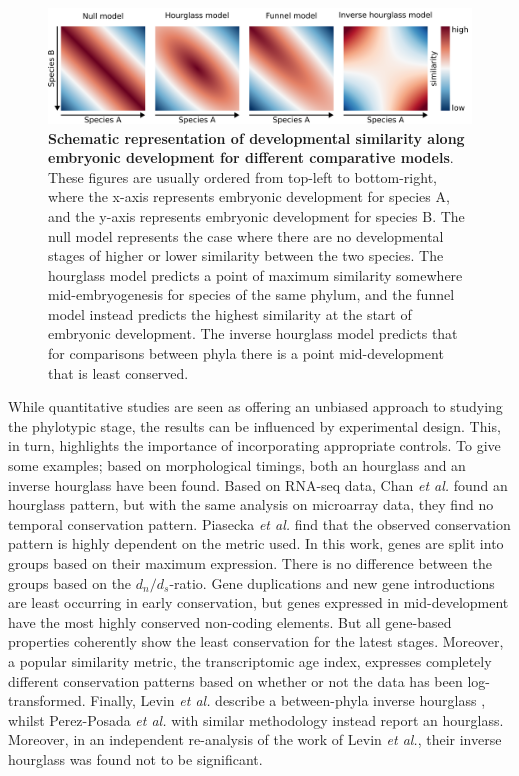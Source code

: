 \begin{figure}[H]
    \includegraphics[width=\linewidth]{ch.hourglass/images/models.png}
    \caption{\textbf{Schematic representation of developmental similarity along embryonic development for different comparative models}. These figures are usually ordered from top-left to bottom-right, where the x-axis represents embryonic development for species A, and the y-axis represents embryonic development for species B. The null model represents the case where there are no developmental stages of higher or lower similarity between the two species. The hourglass model predicts a point of maximum similarity somewhere mid-embryogenesis for species of the same phylum, and the funnel model instead predicts the highest similarity at the start of embryonic development. The inverse hourglass model predicts that for comparisons between phyla there is a point mid-development that is least conserved.}
    \label{fig:models}
\end{figure}

While quantitative studies are seen as offering an unbiased approach to studying the phylotypic stage, the results can be influenced by experimental design. This, in turn, highlights the importance of incorporating appropriate controls. To give some examples; based on morphological timings, both an hourglass\cite{Cordero2020} and an inverse hourglass\cite{OlafRP2003} have been found. Based on RNA-seq data, Chan \textit{et al.} found an hourglass pattern, but with the same analysis on microarray data, they find no temporal conservation pattern\cite{Chan2021}. Piasecka \textit{et al.} find that the observed conservation pattern is highly dependent on the metric used. In this work, genes are split into groups based on their maximum expression. There is no difference between the groups based on the $d_n / d_s$-ratio. Gene duplications and new gene introductions are least occurring in early conservation, but genes expressed in mid-development have the most highly conserved non-coding elements. But all gene-based properties coherently show the least conservation for the latest stages\cite{Piasecka2013}. Moreover, a popular similarity metric, the transcriptomic age index\cite{DomazetLoso2010}, expresses completely different conservation patterns based on whether or not the data has been log-transformed\cite{Piasecka2013}. Finally, Levin \textit{et al.} describe a between-phyla inverse hourglass \cite{Levin2016}, whilst Perez-Posada \textit{et al.} with similar methodology instead report an hourglass\cite{PerezPosada2022}. Moreover, in an independent re-analysis of the work of Levin \textit{et al.}, their inverse hourglass was found not to be significant\cite{Dunn2018}.

